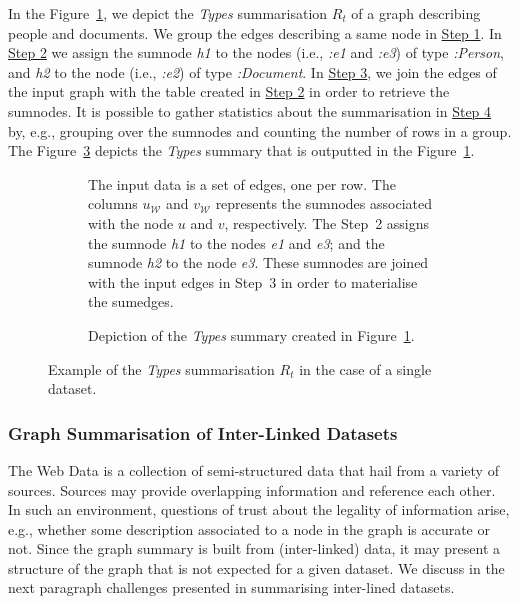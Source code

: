 In the Figure~\ref{tab:algo-ex}, we depict the \emph{Types} summarisation $R_t$ of a graph describing people and documents. We group the edges describing a same node in \hyperref[step-ed]{Step 1}. In \hyperref[step-hn]{Step 2} we assign the sumnode \emph{h1} to the nodes (i.e., \emph{:e1} and \emph{:e3}) of type \emph{:Person}, and \emph{h2} to the node (i.e., \emph{:e2}) of type \emph{:Document}. In \hyperref[step-he]{Step 3}, we join the edges of the input graph with the table created in \hyperref[step-hn]{Step 2} in order to retrieve the sumnodes.
It is possible to gather statistics about the summarisation in \hyperref[step-stats]{Step 4} by, e.g., grouping over the sumnodes and counting the number of rows in a group. The Figure~\ref{fig:algo-ex} depicts the \emph{Types} summary that is outputted in the Figure~\ref{tab:algo-ex}.

\begin{figure}
	\centering
	\begin{subfigure}{\textwidth}
		\centering
		\resizebox{\textwidth}{!}{
			
		}
		\caption{The input data is a set of edges, one per row. The columns $u_\mathcal{W}$ and $v_\mathcal{W}$ represents the sumnodes associated with the node $u$ and $v$, respectively. The Step~2 assigns the sumnode \emph{h1} to the nodes \emph{e1} and \emph{e3}; and the sumnode \emph{h2} to the node \emph{e3}. These sumnodes are joined with the input edges in Step~3 in order to materialise the sumedges.}
		\label{tab:algo-ex}
	\end{subfigure}
	\qquad
	\begin{subfigure}{.7\textwidth}
		\centering
		\resizebox{.7\textwidth}{!}{
			
		}
		\caption{Depiction of the \emph{Types} summary created in Figure~\ref{tab:algo-ex}.}
		\label{fig:algo-ex}
	\end{subfigure}
	\caption{Example of the \emph{Types} summarisation $R_t$ in the case of a single dataset.}
\end{figure}

\subsubsection{Graph Summarisation of Inter-Linked Datasets}
\label{chap03:summary:impl:inter-datasets}

The Web Data is a collection of semi-structured data that hail from a variety of sources. Sources may provide overlapping information and reference each other. In such an environment, questions of trust about the legality of information arise, e.g., whether some description associated to a node in the graph is accurate or not. Since the graph summary is built from (inter-linked) data, it may present a structure of the graph that is not expected for a given dataset. We discuss in the next paragraph challenges presented in summarising inter-lined datasets.

